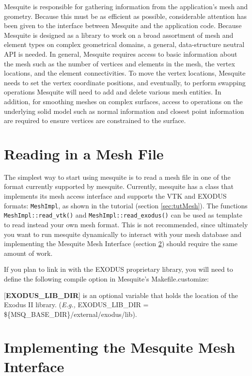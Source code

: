\documentclass[letter]{report}
\begin{document}
Mesquite is responsible for gathering information from the
application's mesh and geometry.  Because this must be as efficient as
possible, considerable attention has been given to the interface
between Mesquite and the application code.  Because Mesquite is
designed as a library to work on a broad assortment of mesh and
element types on complex geometrical domains, a general,
data-structure neutral API is needed.  In general, Mesquite requires
access to basic information about the mesh such as the number of
vertices and elements in the mesh, the vertex locations, and the
element connectivities.  To move the vertex locations, Mesquite needs
to set the vertex coordinate positions, and eventually, to perform
swapping operations Mesquite will need to add and delete various mesh
entities.  In addition, for smoothing meshes on complex surfaces,
access to operations on the underlying solid model such as normal
information and closest point information are required to ensure
vertices are constrained to the surface.

\section{Reading in a Mesh File} \label{sec:meshFiles}

The simplest way to start using mesquite is to read a mesh file in one of the format currently
supported by mesquite. Currently, mesquite has a class that implements its mesh access interface and
supports the VTK \cite{VTKbook, VTKuml} and EXODUS formats: \texttt{MeshImpl}, as shown in the tutorial (section
\ref{sec:tutMesh}). The functions \texttt{MeshImpl::read\_vtk()}
and \texttt{MeshImpl::read\_exodus()} can be used as template to read instead your own mesh format. This is not
recommended, since ultimately you want to run mesquite dynamically to interact with your mesh
database and implementing the Mesquite Mesh Interface (section \ref{sec:msq_mesh}) should require the same amount of work. 

If you plan to link in with the EXODUS proprietary library, you will need to define the following
compile option in Mesquite's Makefile.customize: 

  [{\bf EXODUS\_LIB\_DIR}] is an optional variable that holds the location of the Exodus II library. 
({\it E.g.,} EXODUS\_LIB\_DIR = \$\{MSQ\_BASE\_DIR\}/external/exodus/lib).

\section{Implementing the Mesquite Mesh Interface} \label{sec:msq_mesh}
\end{document}
